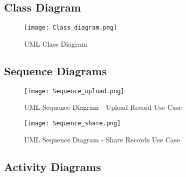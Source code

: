 \FloatBarrier{}
\clearpage

\subsection{Class Diagram}
\begin{figure}[htbp]
    \centering
    \texttt{[image: Class\_diagram.png]}
    \caption{UML Class Diagram}\label{fig:uml_class}
\end{figure}

\FloatBarrier{}
\clearpage

\subsection{Sequence Diagrams}
\begin{figure}[htbp]
    \centering
    \texttt{[image: Sequence\_upload.png]}
    \caption{UML Sequence Diagram - Upload Record Use Case}\label{fig:sequence1}
\end{figure}

\begin{figure}[htbp]
    \centering
    \texttt{[image: Sequence\_share.png]}
    \caption{UML Sequence Diagram - Share Records Use Case}\label{fig:sequence2}
\end{figure}

\FloatBarrier{}

\noindent\begin{minipage}{\textwidth}
    \subsection{Activity Diagrams}
    \begin{center}
        \label{fig:activity1}
    \end{center}
\end{minipage}

\noindent\begin{minipage}{\textwidth}
    \begin{center}
        \label{fig:activity2}
    \end{center}
\end{minipage}

